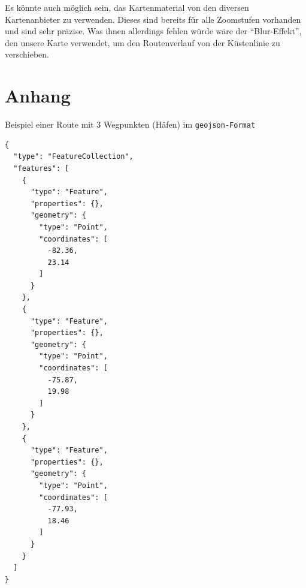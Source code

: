\documentclass[letterpaper]{article}
\begin{document}
		Es könnte auch möglich sein, das Kartenmaterial von den diversen  Kartenanbieter zu verwenden. Dieses sind bereits für alle Zoomstufen vorhanden und sind sehr präzise. Was ihnen allerdings fehlen würde wäre der "`Blur-Effekt"', den unsere Karte verwendet, um den Routenverlauf von der Küstenlinie zu verschieben.


{\footnotesize 
}

\section{Anhang}
		Beispiel einer Route mit 3 Wegpunkten (Häfen) im \texttt{geojson-Format}

		\begin{lstlisting}[captionpos=b, caption=Beispiel Route: Kuba, label=lst:geojson_example, breaklines=false]
{
  "type": "FeatureCollection",
  "features": [
    {
      "type": "Feature",
      "properties": {},
      "geometry": {
        "type": "Point",
        "coordinates": [
          -82.36,
          23.14
        ]
      }
    },
    {
      "type": "Feature",
      "properties": {},
      "geometry": {
        "type": "Point",
        "coordinates": [
          -75.87,
          19.98
        ]
      }
    },
    {
      "type": "Feature",
      "properties": {},
      "geometry": {
        "type": "Point",
        "coordinates": [
          -77.93,
          18.46
        ]
      }
    }
  ]
}
		\end{lstlisting}
\end{document}
